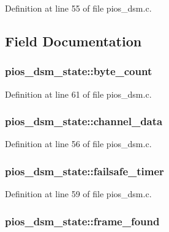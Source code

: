 Definition at line 55 of file pios\-\_\-dsm.\-c.



\subsection{Field Documentation}
\hypertarget{structpios__dsm__state_ad73722b14672f205b7bfd9ebdac3b53a}{
\subsubsection[{byte\-\_\-count}]{ pios\-\_\-dsm\-\_\-state\-::byte\-\_\-count}}\label{structpios__dsm__state_ad73722b14672f205b7bfd9ebdac3b53a}


Definition at line 61 of file pios\-\_\-dsm.\-c.

\hypertarget{structpios__dsm__state_aade4ea4a4eb46a6e63db80e6f4c55b11}{
\subsubsection[{channel\-\_\-data}]{ pios\-\_\-dsm\-\_\-state\-::channel\-\_\-data}}\label{structpios__dsm__state_aade4ea4a4eb46a6e63db80e6f4c55b11}


Definition at line 56 of file pios\-\_\-dsm.\-c.

\hypertarget{structpios__dsm__state_a70f387f5d5e82231a14003705b43fb59}{
\subsubsection[{failsafe\-\_\-timer}]{ pios\-\_\-dsm\-\_\-state\-::failsafe\-\_\-timer}}\label{structpios__dsm__state_a70f387f5d5e82231a14003705b43fb59}


Definition at line 59 of file pios\-\_\-dsm.\-c.

\hypertarget{structpios__dsm__state_a6d1e951d9c03ec9651104491b4ad9b1a}{
\subsubsection[{frame\-\_\-found}]{ pios\-\_\-dsm\-\_\-state\-::frame\-\_\-found}}\label{structpios__dsm__state_a6d1e951d9c03ec9651104491b4ad9b1a}


